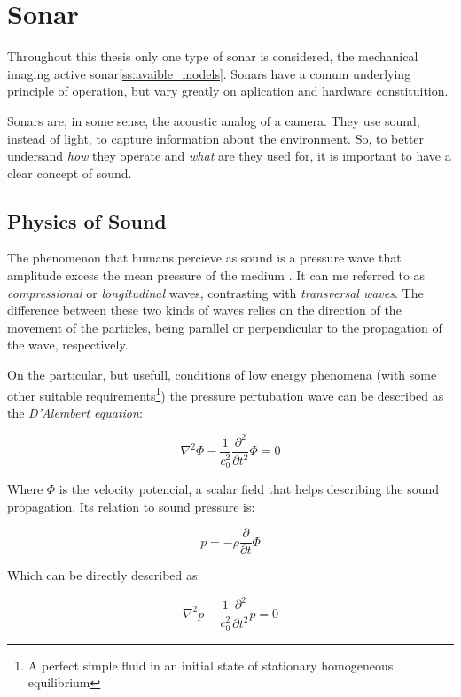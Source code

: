 \section{Sonar}

Throughout this thesis only one type of sonar is considered, the mechanical
imaging active sonar\ref{ss:avaible_models}. Sonars have a comum underlying
principle of operation, but vary greatly on aplication and hardware constituition.

Sonars are, in some sense, the acoustic analog of a camera. They use sound,
instead of light, to capture information about the environment. So, to better
undersand \textit{how} they operate and \textit{what} are they used for, it is
important to have a clear concept of sound.

\subsection{Physics of Sound}

The phenomenon that humans percieve as sound is a pressure wave that amplitude
excess the mean pressure of the medium \cite{FEYNMAN}. It can me referred to as
\textit{compressional} or \textit{longitudinal} waves, contrasting with
\textit{transversal waves}. The difference between these two kinds of waves
relies on the direction of the movement of the particles, being parallel or
perpendicular to the propagation of the wave, respectively\cite{BRUNEAU}.

On the particular, but usefull, conditions of low energy
phenomena\cite{Lefebvre} (with some other suitable requirements\footnote{A
perfect simple fluid in an initial state of stationary homogeneous equilibrium})
the pressure pertubation wave can be described as the \textit{D'Alembert
equation}:
 
\begin{equation}\label{eq:lambert}
\nabla^2 \Phi - \frac{1}{c^2_0}\frac{\partial^2}{\partial t^2} \Phi = 0
\end{equation}

Where $\Phi$ is the velocity potencial, a scalar field that helps describing the
sound propagation. Its relation to sound pressure is:

\[ p =  -\rho \frac{\partial}{\partial t}\Phi \]

Which can be directly described as:

\begin{equation} \label{eq:wave}
\nabla^2 p - \frac{1}{c^2_0}\frac{\partial^2}{\partial t^2} p = 0
\end{equation} 
 
